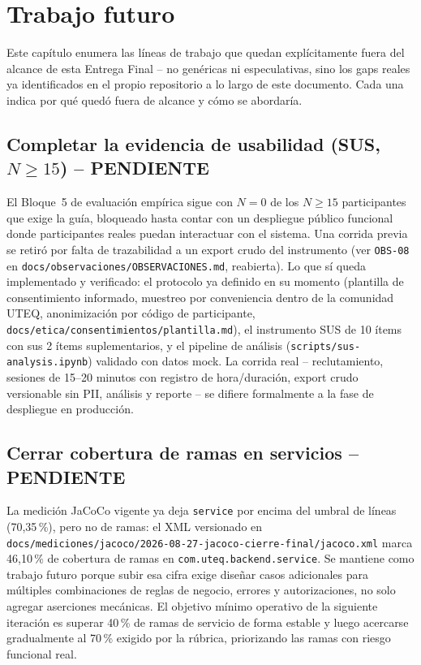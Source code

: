 \chapter{Trabajo futuro}
\label{cap:trabajo-futuro}

Este capítulo enumera las líneas de trabajo que quedan explícitamente
fuera del alcance de esta Entrega Final -- no genéricas ni especulativas,
sino los gaps reales ya identificados en el propio repositorio a lo largo
de este documento. Cada una indica por qué quedó fuera de alcance y cómo
se abordaría.

\section{Completar la evidencia de usabilidad (SUS, $N\geq15$) -- PENDIENTE}
\label{sec:tf-sus}

El Bloque~5 de evaluación empírica sigue con $N=0$ de los $N\geq15$
participantes que exige la guía, bloqueado hasta contar con un
despliegue público funcional donde participantes reales puedan
interactuar con el sistema. Una corrida previa se retiró por falta de
trazabilidad a un export crudo del instrumento
(ver \texttt{OBS-08} en
\texttt{docs/observaciones/OBSERVACIONES.md}, reabierta). Lo que sí
queda implementado y verificado: el protocolo ya definido en su momento
(plantilla de consentimiento informado, muestreo por conveniencia
dentro de la comunidad UTEQ, anonimización por código de participante,
\texttt{docs/etica/consentimientos/plantilla.md}), el instrumento SUS
de 10 ítems \citep{brooke1996sus} con sus 2 ítems suplementarios, y el
pipeline de análisis (\texttt{scripts/sus-analysis.ipynb}) validado con
datos mock. La corrida real -- reclutamiento, sesiones de 15--20 minutos
con registro de hora/duración, export crudo versionable sin PII,
análisis y reporte -- se difiere formalmente a la fase de despliegue en
producción.

\section{Cerrar cobertura de ramas en servicios -- PENDIENTE}
\label{sec:tf-service-branch-coverage}

La medición JaCoCo vigente ya deja \texttt{service} por encima del
umbral de líneas (70,35\,\%), pero no de ramas: el XML versionado en
\texttt{docs/mediciones/jacoco/2026-08-27-jacoco-cierre-final/jacoco.xml}
marca 46,10\,\% de cobertura de ramas en
\texttt{com.uteq.backend.service}. Se mantiene como trabajo futuro
porque subir esa cifra exige diseñar casos adicionales para múltiples
combinaciones de reglas de negocio, errores y autorizaciones, no solo
agregar aserciones mecánicas. El objetivo mínimo operativo de la
siguiente iteración es superar 40\,\% de ramas de servicio de forma
estable y luego acercarse gradualmente al 70\,\% exigido por la rúbrica,
priorizando las ramas con riesgo funcional real.

